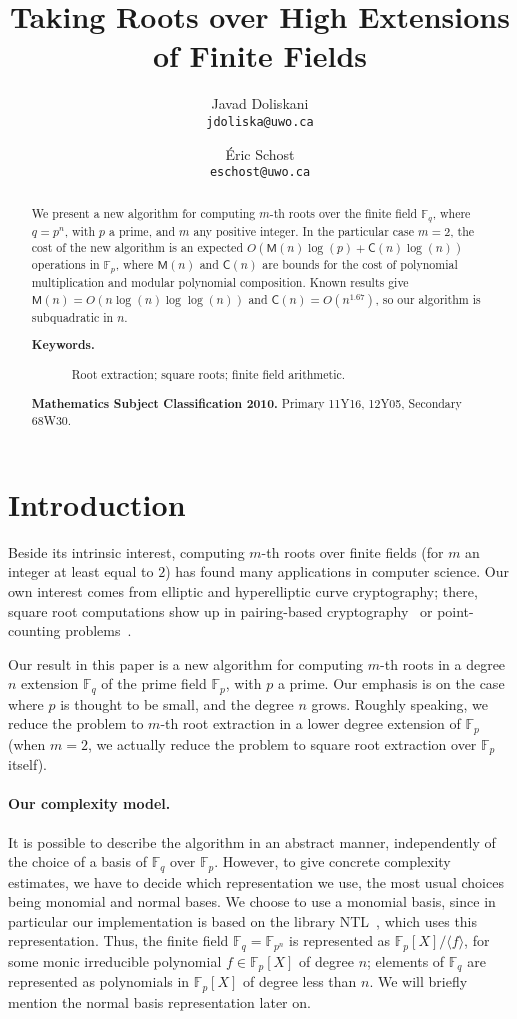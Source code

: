 \documentclass[12pt]{article}
\title{Taking Roots over High Extensions \\ of Finite Fields}
\author{Javad Doliskani \\ \texttt{jdoliska@uwo.ca} 
\and
\'{E}ric Schost \\ \texttt{eschost@uwo.ca}}
\date{}
\theoremstyle{plain}
\theoremstyle{definition}
\def\F{\mathbb{F}}
\def\M{\mathsf{M}}
\def\CC{\mathsf{C}}
\newcounter{algorithm}
\newcommand{\keywords}[1]{\begin{description} \item[\textbf{Keywords.}] #1 \end{description}}
\begin{document}
\maketitle

\begin{abstract}
We present a new algorithm for computing $m$-th roots over the finite
field $\F_q$, where $q = p^n$, with $p$ a prime, and $m$ any positive
integer. In the particular case $m=2$, the cost of the new algorithm
is an expected $O(\M(n)\log (p) + \CC(n)\log(n))$ operations in
$\F_p$, where $\M(n)$ and $\CC(n)$ are bounds for the cost of
polynomial multiplication and modular polynomial composition. Known
results give $\M(n) = O(n\log (n) \log\log (n))$ and $\CC(n) =
O(n^{1.67})$, so our algorithm is subquadratic in $n$.  
\keywords{Root extraction; square roots; finite field arithmetic.}
\textbf{Mathematics Subject Classification 2010.} Primary 11Y16, 12Y05, Secondary 68W30.
\end{abstract}



\section{Introduction}\label{section:intro}

Beside its intrinsic interest, computing $m$-th roots over finite
fields (for $m$ an integer at least equal to $2$) has found many
applications in computer science. Our own interest comes from elliptic
and hyperelliptic curve cryptography; there, square root computations
show up in pairing-based cryptography~\cite{BaKiLySc02} or
point-counting problems~\cite{GaSc10}.


Our result in this paper is a new algorithm for computing $m$-th roots
in a degree $n$ extension $\F_q$ of the prime field $\F_p$, with $p$ a
prime. Our emphasis is on the case where $p$ is thought to be small,
and the degree $n$ grows. Roughly speaking, we reduce the problem to
$m$-th root extraction in a lower degree extension of $\F_p$ (when
$m=2$, we actually reduce the problem to square root extraction over
$\F_p$ itself).



\paragraph{Our complexity model.}
It is possible to describe the algorithm in an abstract manner,
independently of the choice of a basis of $\F_q$ over $\F_p$. However,
to give concrete complexity estimates, we have to decide which
representation we use, the most usual choices being monomial and
normal bases. We choose to use a monomial basis, since in particular
our implementation is based on the library NTL~\cite{NTL2009}, which
uses this representation.  Thus, the finite field $\F_q=\F_{p^n}$ is
represented as $\F_p[X]/\langle f\rangle$, for some monic irreducible
polynomial $f \in \F_p[X]$ of degree $n$; elements of $\F_q$ are
represented as polynomials in $\F_p[X]$ of degree less than $n$. We
will briefly mention the normal basis representation later on.
\end{document}
